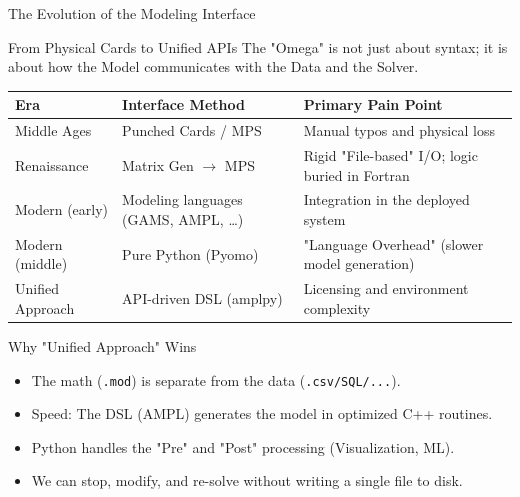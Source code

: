 \documentclass[presentation, aspectratio=169]{beamer}
\begin{document}
\begin{frame}[label={sec:orgd2c0d55},fragile]{The Evolution of the Modeling Interface}
 \begin{block}{From Physical Cards to Unified APIs}
The "Omega" is not just about syntax; it is about how the \alert{Model} communicates with the \alert{Data} and the \alert{Solver}.

\scriptsize
\begin{center}
\begin{tabular}{lll}
\hline
Era & Interface Method & Primary Pain Point\\
\hline
\alert{\alert{Middle Ages}} & Punched Cards / MPS & Manual typos and physical loss\\
\alert{\alert{Renaissance}} & Matrix Gen \(\to\) MPS & Rigid "File-based" I/O; logic buried in Fortran\\
\alert{\alert{Modern (early)}} & Modeling languages (GAMS, AMPL, \ldots{}) & Integration in the deployed system\\
\alert{\alert{Modern (middle)}} & Pure Python (Pyomo) & "Language Overhead" (slower model generation)\\
\alert{\alert{Unified Approach}} & \alert{\alert{API-driven DSL (amplpy)}} & Licensing and environment complexity\\
\hline
\end{tabular}
\end{center}
\end{block}

\begin{block}{Why "Unified Approach" Wins}
\begin{itemize}
\item The math (\texttt{.mod}) is separate from the data (\texttt{.csv/SQL/...}).
\item Speed: The DSL (AMPL) generates the model in optimized C++ routines.
\item Python handles the "Pre" and "Post" processing (Visualization, ML).
\item We can stop, modify, and re-solve without writing a single file to disk.
\end{itemize}
\end{block}
\end{frame}
\end{document}
